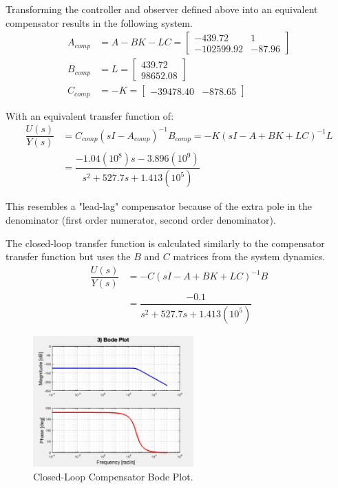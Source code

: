 \documentclass[11pt]{article}
\begin{document}
\begin{enumerate}[label=\textbf{\arabic*.}]
  Transforming the controller and observer defined above into an equivalent 
  compensator results in the following system.
  \begin{equation}
    \begin{split}
      A_{comp} &= A - BK - LC =
      \begin{bmatrix}
        -439.72 & 1 \\ -102599.92 & -87.96
      \end{bmatrix} \\
      B_{comp} &= L =
      \begin{bmatrix}
        439.72 \\ 98652.08
      \end{bmatrix} \\
      C_{comp} &= -K =
      \begin{bmatrix}
        -39478.40 & -878.65
      \end{bmatrix}
    \end{split}
  \end{equation}

  With an equivalent transfer function of:
  \begin{equation}
    \begin{split}
      \dfrac{U(s)}{Y(s)} & = C_{comp}(sI-A_{comp})^{-1}B_{comp} 
      = -K(sI - A + BK + LC)^{-1}L \\
      &= \dfrac{-1.04(10^8)s - 3.896(10^9)}{s^2 + 527.7s + 1.413(10^5)}
    \end{split}
  \end{equation}

  This resembles a "lead-lag" compensator because of the extra pole in the 
  denominator (first order numerator, second order denominator).

  The closed-loop transfer function is calculated similarly to the compensator 
  transfer function but uses the $B$ and $C$ matrices from the system dynamics.
  \begin{equation}
    \begin{split}
      \dfrac{U(s)}{Y(s)} & = -C(sI - A + BK + LC)^{-1}B\\
      &= \dfrac{-0.1}{s^2 + 527.7s + 1.413(10^5)}
    \end{split}
  \end{equation}
  \begin{figure}[H]
    \centering
    \includegraphics[width=0.55\textwidth]{p4.png}
    \caption{Closed-Loop Compensator Bode Plot.}
  \end{figure}


\end{enumerate}
\end{document}
